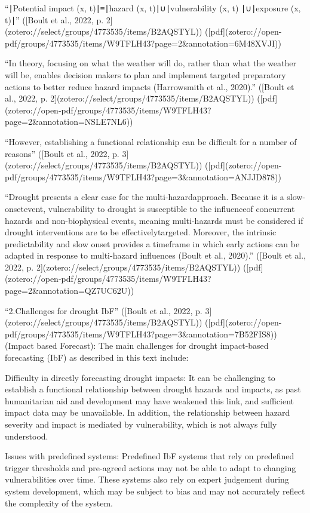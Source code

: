 {“∣Potential impact (x, t)∣≡∣hazard (x, t)∣∪∣vulnerability (x, t) ∣∪∣exposure (x, t)∣” ([Boult et al., 2022, p. 2](zotero://select/groups/4773535/items/B2AQSTYL)) ([pdf](zotero://open-pdf/groups/4773535/items/W9TFLH43?page=2&annotation=6M48XVJI))

“In theory, focusing on what the weather will do, rather than what the weather will be, enables decision makers to plan and implement targeted preparatory actions to better reduce hazard impacts (Harrowsmith et al., 2020).” ([Boult et al., 2022, p. 2](zotero://select/groups/4773535/items/B2AQSTYL)) ([pdf](zotero://open-pdf/groups/4773535/items/W9TFLH43?page=2&annotation=NSLE7NL6))

“However, establishing a functional relationship can be difficult for a number of reasons” ([Boult et al., 2022, p. 3](zotero://select/groups/4773535/items/B2AQSTYL)) ([pdf](zotero://open-pdf/groups/4773535/items/W9TFLH43?page=3&annotation=ANJJD878))

“Drought presents a clear case for the multi-hazardapproach. Because it is a slow-onsetevent, vulnerability to drought is susceptible to the influenceof concurrent hazards and non-biophysical events, meaning multi-hazards must be considered if drought interventions are to be effectivelytargeted. Moreover, the intrinsic predictability and slow onset provides a timeframe in which early actions can be adapted in response to multi-hazard influences (Boult et al., 2020).” ([Boult et al., 2022, p. 2](zotero://select/groups/4773535/items/B2AQSTYL)) ([pdf](zotero://open-pdf/groups/4773535/items/W9TFLH43?page=2&annotation=QZ7UC62U))

“2.Challenges for drought IbF” ([Boult et al., 2022, p. 3](zotero://select/groups/4773535/items/B2AQSTYL)) ([pdf](zotero://open-pdf/groups/4773535/items/W9TFLH43?page=3&annotation=7B52FIS8)) (Impact based Forecast):
The main challenges for drought impact-based forecasting (IbF) as described in this text include:

Difficulty in directly forecasting drought impacts: It can be challenging to establish a functional relationship between drought hazards and impacts, as past humanitarian aid and development may have weakened this link, and sufficient impact data may be unavailable. In addition, the relationship between hazard severity and impact is mediated by vulnerability, which is not always fully understood.

Issues with predefined systems: Predefined IbF systems that rely on predefined trigger thresholds and pre-agreed actions may not be able to adapt to changing vulnerabilities over time. These systems also rely on expert judgement during system development, which may be subject to bias and may not accurately reflect the complexity of the system.

}
